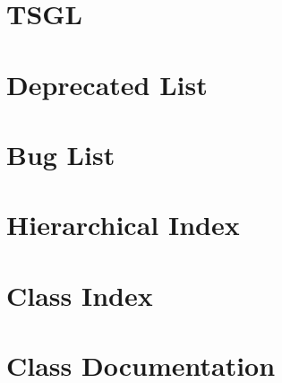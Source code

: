 \documentclass[twoside]{book}
\newcommand{\+}{\discretionary{\mbox{\scriptsize$\hookleftarrow$}}{}{}}
\newcommand{\clearemptydoublepage}{%
  \newpage{\pagestyle{empty}\cleardoublepage}%
}
\begin{document}
\chapter{T\+S\+G\+L}
\label{md__home_pretzel_workspace_tsgl__t_s_g_l_readme}
\hypertarget{md__home_pretzel_workspace_tsgl__t_s_g_l_readme}{}

\chapter{Deprecated List}
\label{deprecated}
\hypertarget{deprecated}{}

\chapter{Bug List}
\label{bug}
\hypertarget{bug}{}

\chapter{Hierarchical Index}

\chapter{Class Index}

\chapter{Class Documentation}





































\backmatter
\newpage
{}
\clearemptydoublepage
{}
\printindex
\end{document}
